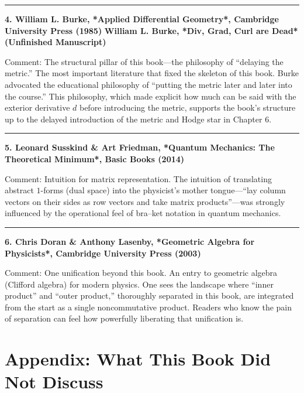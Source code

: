 \begin{center}\rule{0.5\linewidth}{0.5pt}\end{center}

\textbf{4. William L. Burke, *Applied Differential Geometry*, Cambridge University Press (1985)}
\textbf{William L. Burke, *Div, Grad, Curl are Dead* (Unfinished Manuscript)}

Comment: The structural pillar of this book---the philosophy of
``delaying the metric.'' The most important literature that fixed the
skeleton of this book. Burke advocated the educational philosophy of
``putting the metric later and later into the course.'' This philosophy,
which made explicit how much can be said with the exterior derivative
\(d\) before introducing the metric, supports the book's structure up to
the delayed introduction of the metric and Hodge star in Chapter 6.

\begin{center}\rule{0.5\linewidth}{0.5pt}\end{center}

\textbf{5. Leonard Susskind \& Art Friedman, *Quantum Mechanics: The Theoretical Minimum*, Basic Books (2014)}

Comment: Intuition for matrix representation. The intuition of
translating abstract \(1\)-forms (dual space) into the physicist's
mother tongue---``lay column vectors on their sides as row vectors and
take matrix products''---was strongly influenced by the operational feel
of bra--ket notation in quantum mechanics.

\begin{center}\rule{0.5\linewidth}{0.5pt}\end{center}

\textbf{6. Chris Doran \& Anthony Lasenby, *Geometric Algebra for Physicists*, Cambridge University Press (2003)}

Comment: One unification beyond this book. An entry to geometric algebra
(Clifford algebra) for modern physics. One sees the landscape where
``inner product'' and ``outer product,'' thoroughly separated in this
book, are integrated from the start as a single noncommutative product.
Readers who know the pain of separation can feel how powerfully
liberating that unification is.

\newpage

\hypertarget{appendix-what-this-book-did-not-discuss}{%
\chapter{Appendix: What This Book Did Not
Discuss}\label{appendix-what-this-book-did-not-discuss}}

